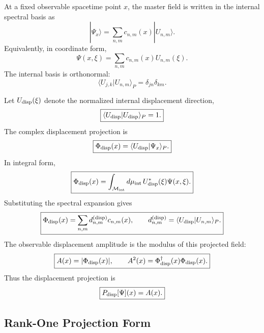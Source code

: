 \documentclass[11pt]{article}
\begin{document}
At a fixed observable spacetime point \(x\), the master field is written in the
internal spectral basis as
\begin{equation}
\boxed{
|\Psi_x\rangle
=
\sum_{n,m}
c_{n,m}(x)|U_{n,m}\rangle .
}
\end{equation}
Equivalently, in coordinate form,
\begin{equation}
\boxed{
\Psi(x,\xi)
=
\sum_{n,m}
c_{n,m}(x)U_{n,m}(\xi).
}
\end{equation}
The internal basis is orthonormal:
\begin{equation}
\boxed{
\langle U_{j,k}|U_{n,m}\rangle_P
=
\delta_{jn}\delta_{km}.
}
\end{equation}

Let \(U_{\rm disp}(\xi)\) denote the normalized internal displacement direction,
\begin{equation}
\boxed{
\langle U_{\rm disp}|U_{\rm disp}\rangle_P=1.
}
\end{equation}
The complex displacement projection is
\begin{equation}
\boxed{
\Phi_{\rm disp}(x)
=
\langle U_{\rm disp}|\Psi_x\rangle_P.
}
\end{equation}
In integral form,
\begin{equation}
\boxed{
\Phi_{\rm disp}(x)
=
\int_{\mathcal M_{\rm int}}
d\mu_{\rm int}\,
U_{\rm disp}^{*}(\xi)\Psi(x,\xi).
}
\end{equation}
Substituting the spectral expansion gives
\begin{equation}
\boxed{
\Phi_{\rm disp}(x)
=
\sum_{n,m}
d_{n,m}^{({\rm disp})}c_{n,m}(x),
\qquad
d_{n,m}^{({\rm disp})}
=
\langle U_{\rm disp}|U_{n,m}\rangle_P.
}
\end{equation}
The observable displacement amplitude is the modulus of this projected field:
\begin{equation}
\boxed{
A(x)
=
|\Phi_{\rm disp}(x)|,
\qquad
A^2(x)=\Phi_{\rm disp}^{\dagger}(x)\Phi_{\rm disp}(x).
}
\end{equation}
Thus the displacement projection is
\begin{equation}
\boxed{
P_{\rm disp}[\Psi](x)=A(x).
}
\end{equation}

\subsection{Rank-One Projection Form}
\end{document}
